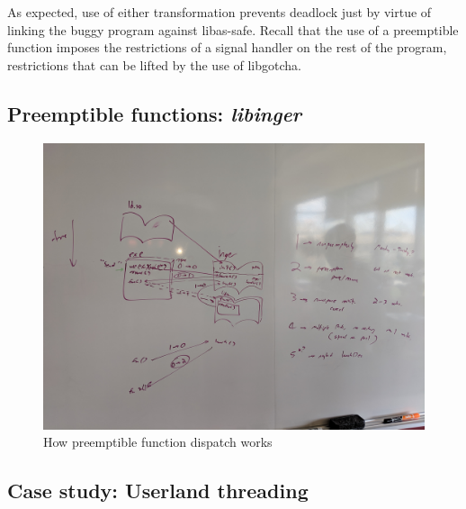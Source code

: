As expected, use of either transformation prevents deadlock just by virtue of linking
the buggy program against libas-safe.  Recall that the use of a preemptible function
imposes the restrictions of a signal handler on the rest of the program, restrictions
that can be lifted by the use of libgotcha.

\subsection{Preemptible functions: \textit{libinger}}
\label{sec:libinger}

\begin{figure}
\includegraphics[width=\columnwidth]{figs/calltree}
\caption{How preemptible function dispatch works}
\end{figure}

\subsection{Case study: Userland threading}
\label{sec:threading}



